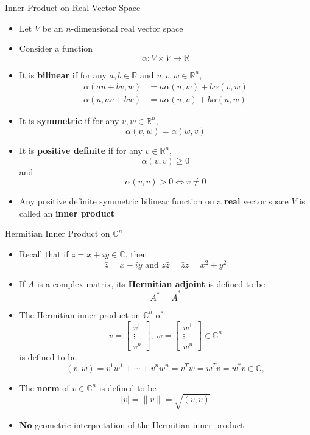 \documentclass[usenames,dvipsnames,10pt]{beamer}
\newcommand\C{\mathbb{C}}
\newcommand{\R}{\mathbb{R}}
\begin{document}
\begin{frame}
  {Inner Product on Real Vector Space}

  \begin{itemize}
  \item Let $V$ be an $n$-dimensional real vector space
  \item Consider a function
    \[ \alpha: V\times V \rightarrow \R \]
  \item It is {\bf bilinear} if for any $a, b \in \R$ and $u,v,w\in \R^n$,
    \begin{align*}
      \alpha(au+bv,w) &= a\alpha(u,w) + b\alpha(v,w)\\
      \alpha(u,av+bw) &= a\alpha(u,v) + b\alpha(u,w)
    \end{align*}
  \item It is {\bf symmetric} if for any $v,w \in \R^n$,
    \[ \alpha(v,w) = \alpha(w,v) \]
  \item It is {\bf positive definite} if for any $v \in \R^n$,
    \[
      \alpha(v,v) \ge 0
    \]
    and
    \[
      \alpha(v,v) > 0 \iff v \ne 0
    \]
  \item Any positive definite symmetric bilinear function on a {\bf real} vector space $V$ is called an {\bf inner product}
  \end{itemize}
\end{frame}

\begin{frame}
  {Hermitian Inner Product on $\C^n$}

  \begin{itemize}
  \item Recall that if $z = x+iy \in \C$, then
    \[
      \bar{z} = x-iy\text{ and }z\bar{z} = \bar{z}z = x^2+y^2
    \]
  \item If $A$ is a complex matrix, its {\bf Hermitian adjoint} is defined to be
    \[
      A^* = \bar{A}^*
    \]
  \item The Hermitian inner product on $\C^n$ of
    \[
      v = \begin{bmatrix} v^1\\ \vdots \\ v^n \end{bmatrix},
      \ w = \begin{bmatrix} w^1\\ \vdots \\ w^n \end{bmatrix} \in \C^n
    \]
    is defined to be
    \[
      (v,w) = v^1\bar{w}^1+\cdots+v^n\bar{w}^n = v^T\bar{w} = \bar{w}^Tv = w^*v\in \C,
    \]
  \item The {\bf norm} of $v \in \C^n$ is defined to be
    \[
      |v| = \|v\| = \sqrt{(v,v)}
    \]
  \item {\bf No} geometric interpretation of the Hermitian inner product
  \end{itemize}
\end{frame}
\end{document}
